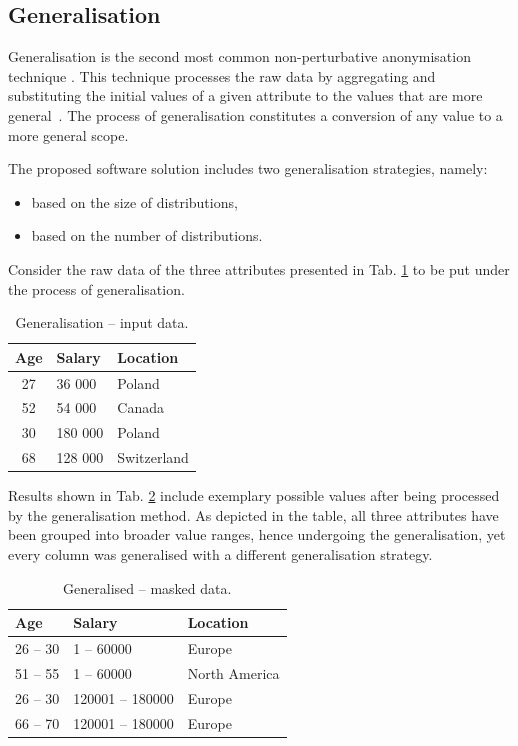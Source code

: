 \documentclass[a4paper,twoside,12pt]{book}
\begin{document}
\subsection{Generalisation}

Generalisation is the second most common non-perturbative anonymisation technique \cite{bib:privacy_unesco_bigdata}. This technique processes the raw data by aggregating and substituting the initial values of a given attribute to the values that are more general~\cite{bib:privacy_unesco_rule_based}. The process of generalisation constitutes a conversion of any value to a more general scope.

The proposed software solution includes two generalisation strategies, namely:
\begin{itemize}
\item based on the size of distributions,
\item based on the number of distributions.
\end{itemize}

Consider the raw data of the three attributes presented in Tab. \ref{id:tab:generalisation_raw} to be put under the process of generalisation.

\begin{table}%
\centering
\caption{Generalisation – input data.}
\label{id:tab:generalisation_raw}
\begin{tabular}{@{}cll@{}}
\toprule
\multicolumn{1}{l}{Age} & Salary  & Location    \\ \midrule
27                      & 36 000  & Poland      \\
52                      & 54 000  & Canada      \\
30                      & 180 000 & Poland      \\
68                      & 128 000 & Switzerland \\ \bottomrule
\end{tabular}
\end{table}

Results shown in Tab. \ref{id:tab:generalisation} include exemplary possible values after being processed by the generalisation method. As depicted in the table, all three attributes have been grouped into broader value ranges, hence undergoing the generalisation, yet every column was generalised with a different generalisation strategy.

\begin{table}%
\centering
\caption{Generalised – masked data.}
\label{id:tab:generalisation}
\begin{tabular}{lll}
\toprule
Age   & Salary          & Location      \\ \midrule
26 – 30 & 1 – 60000       & Europe        \\
51 – 55 & 1 – 60000       & North America \\
26 – 30 & 120001 – 180000 & Europe        \\
66 – 70 & 120001 – 180000 & Europe        \\ \bottomrule
\end{tabular}
\end{table}
\end{document}
